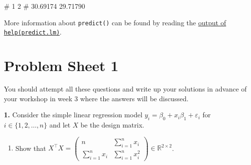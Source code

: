 \documentclass[
  a4paper,
]{article}
\newenvironment{Shaded}{\begin{snugshade}}{\end{snugshade}}
\newcommand{\NormalTok}[1]{#1}
\providecommand{\tightlist}{%
  \setlength{\itemsep}{0pt}\setlength{\parskip}{0pt}}
\theoremstyle{definition}
\theoremstyle{definition}
\theoremstyle{definition}
\theoremstyle{definition}
\theoremstyle{remark}
\begin{document}
\begin{Shaded}
\begin{Highlighting}[]
\NormalTok{\#        1        2 }
\NormalTok{\# 30.69174 29.71790}
\end{Highlighting}
\end{Shaded}

More information about \texttt{predict()} can be found by reading
the \href{https://rdrr.io/r/stats/predict.html}{output of \texttt{help(predict.lm)}}.

\clearpage

\hypertarget{P01}{%
\section*{Problem Sheet 1}\label{P01}}


You should attempt all these questions and write up your solutions in advance
of your workshop in week 3 where the answers will be discussed.

\textbf{1.} Consider the simple linear regression model
\(y_i = \beta_0 + x_{i} \beta_1 + \varepsilon_i\) for
\(i \in \{1, 2, \ldots, n\}\) and let \(X\) be the design matrix.

\begin{enumerate}
\def\labelenumi{\alph{enumi}.}
\tightlist
\item
  Show that \(\displaystyle X^\top X = \begin{pmatrix}  n & \sum_{i=1}^n x_i \\  \sum_{i=1}^n x_i & \sum_{i=1}^n x_i^2  \end{pmatrix} \in \mathbb{R}^{2\times 2}\).
\end{enumerate}
\end{document}
